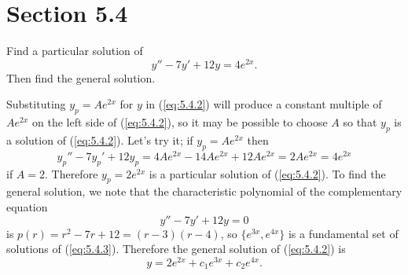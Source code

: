 \section*{Section 5.4}
\setcounter{chapter}{5}
\setcounter{section}{4}

\setcounter{example}{0}
\setcounter{equation}{1}
\begin{example}
  \label{example:5.4.1} \rm Find a particular solution of
  \begin{equation}
    \label{eq:5.4.2}y''-7y'+12y=4e^{2x}.
  \end{equation}
  Then find the general solution.
\end{example}
\setcounter{equation}{2}
\begin{examplesolution}
\solution Substituting $y_{p}=Ae^{2x}$ for $y$ in (\ref{eq:5.4.2}) will produce a constant multiple
of $Ae^{2x}$ on the left side of (\ref{eq:5.4.2}), so it may be possible to choose $A$ so that
$y_{p}$ is a solution of (\ref{eq:5.4.2}). Let's try it; if $y_{p}=Ae^{2x}$ then
\[
  y_{p}''-7y_{p}'+12y_{p}=4Ae^{2x}-14Ae^{2x}+12Ae^{2x}=2Ae^{2x}=4e^{2x}
\]
if $A=2$. Therefore $y_{p}=2e^{2x}$ is a particular solution of (\ref{eq:5.4.2}). To find the
general solution, we note that the characteristic polynomial of the complementary equation
\begin{equation}
  \label{eq:5.4.3}y''-7y'+12y=0
\end{equation}
is $p(r)=r^{2}-7r+12=(r-3)(r-4)$, so $\{e^{3x},e^{4x}\}$ is a fundamental set of solutions of
(\ref{eq:5.4.3}). Therefore the general solution of (\ref{eq:5.4.2}) is
\[
  y=2e^{2x}+c_{1}e^{3x}+c_{2}e^{4x}.
\]
\end{examplesolution}

